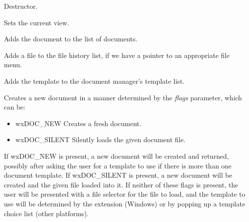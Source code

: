 

Destructor.



Sets the current view.



Adds the document to the list of documents.



Adds a file to the file history list, if we have a pointer to an appropriate file menu.



Adds the template to the document manager's template list.



Creates a new document in a manner determined by the {\it flags} parameter, which can be:

\begin{itemize}\itemsep=0pt
\item wxDOC\_NEW Creates a fresh document.
\item wxDOC\_SILENT Silently loads the given document file.
\end{itemize}

If wxDOC\_NEW is present, a new document will be created and returned, possibly after
asking the user for a template to use if there is more than one document template.
If wxDOC\_SILENT is present, a new document will be created and the given file loaded
into it. If neither of these flags is present, the user will be presented with
a file selector for the file to load, and the template to use will be determined by the
extension (Windows) or by popping up a template choice list (other platforms).

